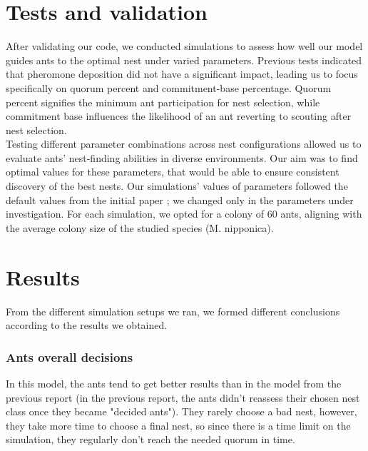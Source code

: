 \documentclass[9pt]{pnas-new}
\begin{document}
\section*{Tests and validation}
After validating our code, we conducted simulations to assess how well our model guides ants to the optimal nest under varied parameters. Previous tests indicated that pheromone deposition did not have a significant impact, leading us to focus specifically on quorum percent and commitment-base percentage. Quorum percent signifies the minimum ant participation for nest selection, while commitment base influences the likelihood of an ant reverting to scouting after nest selection.\\ 
Testing different parameter combinations across nest configurations allowed us to evaluate ants' nest-finding abilities in diverse environments. Our aim was to find optimal values for these parameters, that would be able to ensure consistent discovery of the best nests. Our simulations’ values of parameters followed the default values from the initial paper ; we changed only in the parameters under investigation. For each simulation, we opted for a colony of 60 ants, aligning with the average colony size of the studied species (M. nipponica).





\section*{Results}
From the different simulation setups we ran, we formed different conclusions according to the results we obtained. 

\subsubsection*{Ants overall decisions}
In this model, the ants tend to get better results than in the model from the previous report (in the previous report, the ants didn't reassess their chosen nest class once they became "decided ants"). They rarely choose a bad nest, however, they take more time to choose a final nest, so since there is a time limit on the simulation, they regularly don't reach the needed quorum in time.
\end{document}
